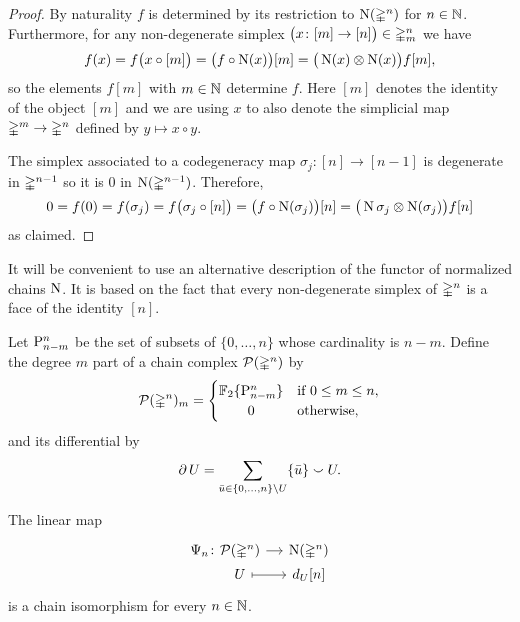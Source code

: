 \begin{proof}
	By naturality $f$ is determined by its restriction to $\chains(\simplex^n)$ for $n \in \N$.
	Furthermore, for any non-degenerate simplex $\big( x \colon [m] \to [n] \big) \in \simplex^n_m$ we have
	\[
	f(x) = f \big( x \circ [m] \big) =
	\big( f \circ \chains(x) \big) [m] =
	\big( \chains(x) \ot \chains(x) \big) f[m],
	\]
	so the elements $f[m]$ with $m \in \N$ determine $f$.
	Here $[m]$ denotes the identity of the object $[m]$ and we are using $x$ to also denote the simplicial map $\simplex^m \to \simplex^n$ defined by $y \mapsto x \circ y$.

	The simplex associated to a codegeneracy map $\sigma_j \colon [n] \to [n-1]$ is degenerate in $\simplex^{n-1}$ so it is $0$ in $\chains(\simplex^{n-1})$.
	Therefore,
	\[
	0 = f(0) = f(\sigma_j) =
	f \big( \sigma_j \circ [n] \big) =
	\big( f \circ \chains(\sigma_j) \big) [n] =
	\big( \chains \sigma_j \ot \chains(\sigma_j) \big) f[n]
	\]
	as claimed.
\end{proof}

It will be convenient to use an alternative description of the functor of normalized chains $\chains$.
It is based on the fact that every non-degenerate simplex of $\simplex^n$ is a face of the identity $[n]$.

\begin{definition} \label{d:dual standard chains}
	Let $\P_{n-m}^n$ be the set of subsets of $\{0, \dots, n\}$ whose cardinality is $n-m$.
	Define the degree $m$ part of a chain complex $\cP(\simplex^n)$ by
	\[
	\cP(\simplex^n)_m = \begin{cases}
	\F\{\P_{n-m}^n\} & \text{if } 0 \leq m \leq n, \\
	\hfil 0 & \text{otherwise},
	\end{cases}
	\]
	and its differential by
	\begin{equation} \label{e:boundary of P(simplex)}
	\bd U = \sum_{\bar u \in \{0, \dots, n\} \setminus U} \{\bar u\} \union U.
	\end{equation}
\end{definition}

\begin{lemma}
	The linear map
	\[
	\begin{tikzcd} [column sep=small, row sep=0]
	\Psi_n \colon &[-20pt] \cP(\simplex^n) \arrow[r] & \chains(\simplex^n) \\
	& U \arrow[r, mapsto] & d_U [n]
	\end{tikzcd}
	\]
	is a chain isomorphism for every $n \in \N$.
\end{lemma}

